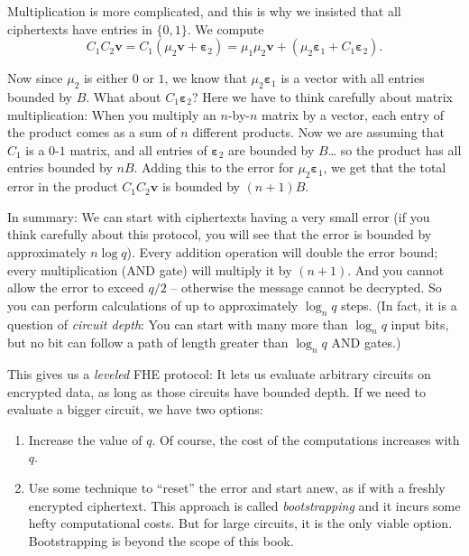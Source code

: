 Multiplication is more complicated, and this is why we insisted that all
ciphertexts have entries in \(\{ 0,1 \}\). We compute
\[C_{1}C_{2}\mathbf{v} = C_{1}( \mu_{2}\mathbf{v} + \mathbf{\varepsilon}_{2} ) = \mu_{1}\mu_{2}\mathbf{v} + ( \mu_{2}\mathbf{\varepsilon}_{1} + C_{1}\mathbf{\varepsilon}_{2} ).\]

Now since \(\mu_{2}\) is either \(0\) or \(1\), we know that
\(\mu_{2}\mathbf{\varepsilon}_{1}\) is a vector with all entries bounded
by \(B\). What about \(C_{1}\mathbf{\varepsilon}_{2}\)? Here we have to
think carefully about matrix multiplication: When you multiply an
\(n\)-by-\(n\) matrix by a vector, each entry of the product comes as a
sum of \(n\) different products. Now we are assuming that \(C_{1}\) is a
\(0\)-\(1\) matrix, and all entries of \(\mathbf{\varepsilon}_{2}\) are
bounded by \(B\)\ldots{} so the product has all entries bounded by
\(nB\). Adding this to the error for
\(\mu_{2}\mathbf{\varepsilon}_{1}\), we get that the total error in the
product \(C_{1}C_{2}\mathbf{v}\) is bounded by \((n + 1)B\).

In summary: We can start with ciphertexts having a very small error (if
you think carefully about this protocol, you will see that the error is
bounded by approximately \(n\log q\)). Every addition operation will
double the error bound; every multiplication (AND gate) will multiply it
by \((n + 1)\). And you cannot allow the error to exceed \(q/2\) --
otherwise the message cannot be decrypted. So you can perform
calculations of up to approximately \(\log_{n}q\) steps. (In fact, it is
a question of \emph{circuit depth}: You can start with many more than
\(\log_{n}q\) input bits, but no bit can follow a path of length greater
than \(\log_{n}q\) AND gates.)

This gives us a \emph{leveled} FHE protocol: It lets us evaluate
arbitrary circuits on encrypted data, as long as those circuits have
bounded depth. If we need to evaluate a bigger circuit, we have two
options:

\begin{enumerate}
\item
  Increase the value of \(q\). Of course, the cost of the computations
  increases with \(q\).
\item
  Use some technique to ``reset'' the error and start anew, as if with a
  freshly encrypted ciphertext. This approach is called
  \emph{bootstrapping} and it incurs some hefty computational costs. But
  for large circuits, it is the only viable option. Bootstrapping is
  beyond the scope of this book.
\end{enumerate}
